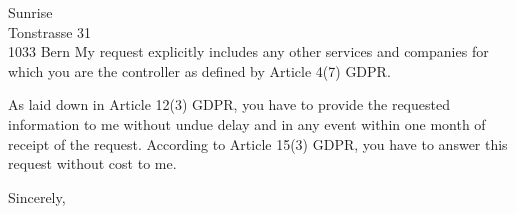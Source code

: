 \documentclass[11pt, a4paper]{letter} %
\begin{document}
\begin{letter}{
	Sunrise\\
	Tonstrasse 31 \\
    1033 Bern
}
My request explicitly includes any other services and companies for which you are the controller as defined by Article 4(7) GDPR.

As laid down in Article 12(3) GDPR, you have to provide the requested information to me without undue delay and in any event within one month of receipt of the request. According to Article 15(3) GDPR, you have to answer this request without cost to me.

\closing{Sincerely,}




\end{letter}
\end{document}
